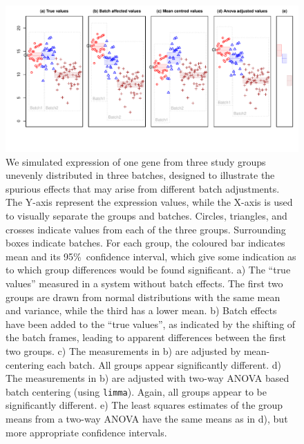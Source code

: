\documentclass{bio}
\begin{document}
\begin{figure}[!p]
\centering\includegraphics[width=14.5cm]{Fig/boxplots.pdf}
\caption{We simulated expression of one gene from three study groups unevenly distributed in three batches, designed to illustrate the spurious effects that may arise from different batch adjustments. The Y-axis represent the expression values, while the X-axis is used to visually separate the groups and batches. Circles, triangles, and crosses indicate values from each of the three groups. Surrounding boxes indicate batches. For each group, the coloured bar indicates mean and its 95\%~confidence interval, which give some indication as to which group differences would be found significant.
a) The ``true values'' measured in a system without batch effects. The first two groups are drawn from normal distributions with the same mean and variance, while the third has a lower mean.
b) Batch effects have been added to the ``true values'', as indicated by the shifting of the batch frames, leading to apparent differences between the first two groups.
c) The measurements in b) are adjusted by mean-centering each batch. All groups appear significantly different.
d) The measurements in b) are adjusted with two-way ANOVA based batch centering (using \texttt{limma}). Again, all groups appear to be significantly different.
e) The least squares estimates of the group means from a two-way ANOVA have the same means as in d), but more appropriate confidence intervals.
}
\label{fig:boxplots}
\end{figure}
\end{document}
